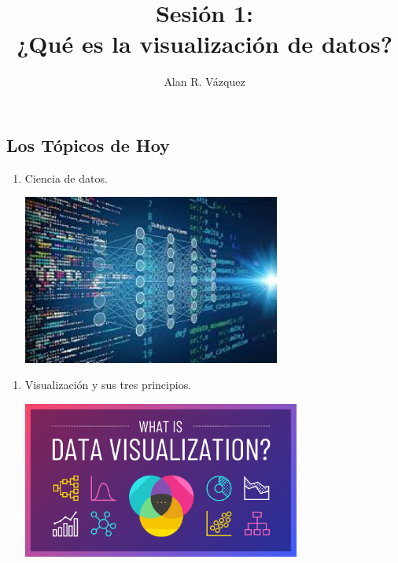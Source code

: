 \documentclass[
  letterpaper,
  DIV=11,
  numbers=noendperiod]{scrartcl}
\title{Sesión 1:\\
¿Qué es la visualización de datos?}
\author{Alan R. Vázquez}
\date{}
\renewcommand*\contentsname{Table of contents}
\newcommand\contentsname{Table of contents}
\begin{document}
\maketitle
\ifdefined\Shaded\renewenvironment{Shaded}{\begin{tcolorbox}[boxrule=0pt, frame hidden, enhanced, sharp corners, borderline west={3pt}{0pt}{shadecolor}, interior hidden, breakable]}{\end{tcolorbox}}\fi

\renewcommand*\contentsname{Table of contents}
{
\hypersetup{linkcolor=}
\setcounter{tocdepth}{3}
\tableofcontents
}
\hypertarget{los-tuxf3picos-de-hoy}{%
\subsection{Los Tópicos de Hoy}\label{los-tuxf3picos-de-hoy}}

\begin{enumerate}
\def\labelenumi{\arabic{enumi}.}
\item
  Ciencia de datos.

  \includegraphics[width=3.33333in,height=\textheight]{images/clipboard-974366284.png}
\end{enumerate}

\begin{enumerate}
\def\labelenumi{\arabic{enumi}.}
\setcounter{enumi}{1}
\item
  Visualización y sus tres principios.

  \includegraphics[width=3.59375in,height=\textheight]{images/clipboard-1163901538.png}
\end{enumerate}
\end{document}
